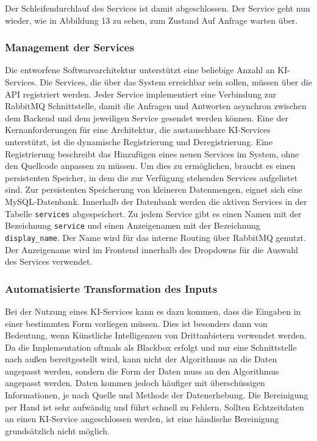 Der Schleifendurchlauf des Services ist damit abgeschlossen. Der Service geht nun wieder, wie in Abbildung 13 zu sehen, zum Zustand \glqq Auf Anfrage warten\grqq{} über. 

\subsubsection{Management der Services}
Die entworfene Softwarearchitektur unterstützt eine beliebige Anzahl an KI-Services. Die Services, die über das System erreichbar sein sollen, müssen über die API registriert werden. Jeder Service implementiert eine Verbindung zur RabbitMQ Schnittstelle, damit die Anfragen und Antworten asynchron zwischen dem Backend und dem jeweiligen Service gesendet werden können. Eine der Kernanforderungen für eine Architektur, die austauschbare KI-Services unterstützt, ist die dynamische Registrierung und Deregistrierung. Eine Registrierung beschreibt das Hinzufügen eines neuen Services im System, ohne den Quellcode anpassen zu müssen. Um dies zu ermöglichen, braucht es einen persistenten Speicher, in dem die zur Verfügung stehenden Services aufgelistet sind. Zur persistenten Speicherung von kleineren Datenmengen, eignet sich eine MySQL-Datenbank. Innerhalb der Datenbank werden die aktiven Services in der Tabelle \texttt{services} abgespeichert. Zu jedem Service gibt es einen Namen mit der Bezeichnung \texttt{service} und einen Anzeigenamen mit der Bezeichnung \texttt{display\_{}name}. Der Name wird für das interne Routing über RabbitMQ genutzt. Der Anzeigename wird im Frontend innerhalb des Dropdowns für die Auswahl des Services verwendet.

\subsubsection{Automatisierte Transformation des Inputs}
Bei der Nutzung eines KI-Services kann es dazu kommen, dass die Eingaben in einer bestimmten Form vorliegen müssen. Dies ist besonders dann von Bedeutung, wenn Künstliche Intelligenzen von Drittanbietern verwendet werden. Da die Implementation oftmals als Blackbox erfolgt und nur eine Schnittstelle nach außen bereitgestellt wird, kann nicht der Algorithmus an die Daten angepasst werden, sondern die Form der Daten muss an den Algorithmus angepasst werden. Daten kommen jedoch häufiger mit überschüssigen Informationen, je nach Quelle und Methode der Datenerhebung. Die Bereinigung per Hand ist sehr aufwändig und führt schnell zu Fehlern. Sollten Echtzeitdaten an einen KI-Service angeschlossen werden, ist eine händische Bereinigung grundsätzlich nicht möglich.

